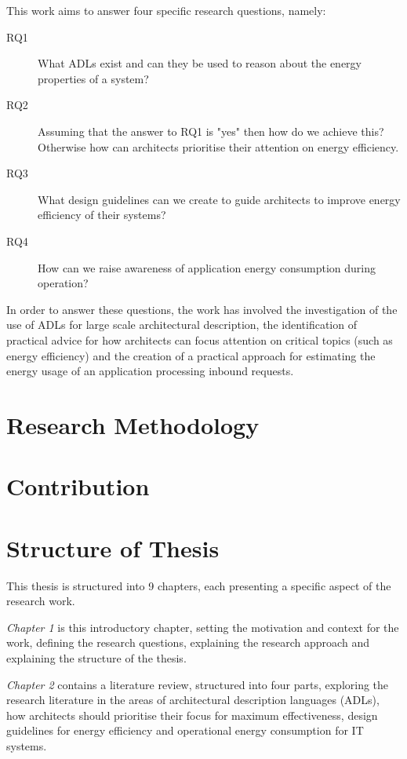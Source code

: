 This work aims to answer four specific research questions, namely:

\begin{description}
\item [RQ1] What ADLs exist and can they be used to reason about the energy properties of a system?
\item [RQ2] Assuming that the answer to RQ1 is "yes" then how do we achieve this?  Otherwise how can architects prioritise their attention on energy efficiency.
\item [RQ3] What design guidelines can we create to guide architects to improve energy efficiency of their systems?
\item [RQ4] How can we raise awareness of application energy consumption during operation?
\end{description}

In order to answer these questions, the work has involved the investigation of the use of ADLs for large scale architectural description, the identification of practical advice for how architects can focus attention on critical topics (such as energy efficiency) and the creation of a practical approach for estimating the energy usage of an application processing inbound requests.

\section{Research Methodology}

\section{Contribution}

\section{Structure of Thesis}

This thesis is structured into 9 chapters, each presenting a specific aspect of the research work.

\emph{Chapter 1} is this introductory chapter, setting the motivation and context for the work, defining the research questions, explaining the research approach and explaining the structure of the thesis.

\emph{Chapter 2} contains a literature review, structured into four parts, exploring the research literature in the areas of architectural description languages (ADLs), how architects should prioritise their focus for maximum effectiveness, design guidelines for energy efficiency and operational energy consumption for IT systems.

